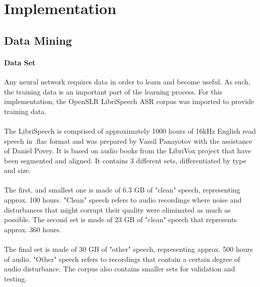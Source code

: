 \chapter{Implementation}\label{ch:implementation}

\section{Data Mining} \label{sec:DataMining}
\subsubsection{Data Set}
Any neural network requires data in order to learn and become useful. As such, the training data is an important part of the learning process. For this implementation, the OpenSLR LibriSpeech ASR corpus was imported to provide training data.\\\\
The LibriSpeech is comprised of approximately 1000 hours of 16kHz English read speech in .flac format and was prepared by Vassil Panayotov with the assistance of Daniel Povey. It is based on audio books from the LibriVox project that have been segmented and aligned. It contains 3 different sets, differentiated by type and size.\\\\
The first, and smallest one is made of 6.3 GB of "clean" speech, representing approx. 100 hours. "Clean" speech refers to audio recordings where noise and disturbances that might corrupt their quality were eliminated as much as possible.
The second set is made of 23 GB of "clean" speech that represents approx. 360 hours.\\\\
The final set is made of 30 GB of "other" speech, representing approx. 500 hours of audio. "Other" speech refers to recordings that contain a certain degree of audio disturbance.
The corpus also contains smaller sets for validation and testing.

